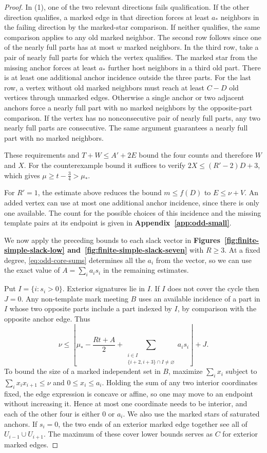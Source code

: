 \documentclass[preprint,11pt,numbers]{elsarticle-arxiv}
\numberwithin{equation}{section}
\theoremstyle{definition}
\begin{document}
\begin{proof}
In (1), one of the two relevant directions fails qualification.
If the other direction qualifies, a marked edge
in that direction forces at least $a_*$ neighbors in the failing
direction by the marked-star comparison. If neither qualifies, the
same comparison applies to any old marked neighbor. The second row
follows since one of the nearly full parts has at most $w$ marked
neighbors. In the third row, take a pair of nearly full parts for
which the vertex qualifies. The marked star from the missing anchor forces
at least $a_*$ further host neighbors in a third old part. There is
at least one additional anchor incidence outside the three parts.
For the last row, a vertex without old marked neighbors must reach
at least $C-D$ old vertices through unmarked edges. Otherwise a
single anchor or two adjacent anchors force a nearly full part
with no marked neighbors by the opposite-part comparison.
If the vertex has no nonconsecutive pair of nearly full parts, any
two nearly full parts are consecutive. The same argument guarantees
a nearly full part with no marked neighbors.

These requirements and $T+W\leq A'+2E$ bound the four counts and
therefore $W$ and $X$. For the counterexample bound it suffices to
verify $2X\leq (R'-2)D+3$, which gives $\mu\geq t-\frac{3}{4}>\mu_*$.

For $R'=1$, the estimate above reduces the bound $m\leq f(D)$ to 
$E\leq\nu+V$. An added vertex can use at most one additional anchor
incidence, since there is only one available. The count for the possible
choices of this incidence and the missing template pairs at its endpoint
is given in \textbf{Appendix~\ref{app:odd-small}}.

We now apply the preceding bounds to each slack vector in
\textbf{Figures~\ref{fig:finite-simple-slack-low}
and~\ref{fig:finite-simple-slack-seven}} with $R\geq3$.
At a fixed degree, \eqref{eq:odd-core-sums} determines all the
$a_i$ from the vector, so we can use the exact value of
$A=\sum_i a_is_i$ in the remaining estimates.

Put $I=\{i:s_i>0\}$. Exterior signatures lie in $I$. If $I$ does
not cover the cycle then $J=0$. Any non-template mark meeting $B$
uses an available incidence of a part in $I$ whose two opposite
parts include a part indexed by $I$,
by comparison with the opposite anchor edge. Thus
\[
 \nu\leq\left\lfloor \mu_*-\frac{Rt+A}{2}+
 \sum_{\substack{i\in I\\ \{i+2,i+3\}\cap I\ne\varnothing}}a_is_i
 \right\rfloor+J.
\]
To bound the size of a marked independent set in $B$, maximize
$\sum_i x_i$ subject to $\sum_i x_ix_{i+1}\leq \nu$ and
$0\leq x_i\leq a_i$. Holding the sum of any two interior coordinates
fixed, the edge expression is concave or affine, so one may move to
an endpoint without increasing it. Hence at most one coordinate
needs to be interior, and each of the other four is either $0$ or
$a_i$. We also use the marked stars of saturated anchors.
If $s_i=0$, the two ends of an exterior marked edge together
see all of $U_{i-1}\cup U_{i+1}$. The maximum of these cover
lower bounds serves as $C$ for exterior marked edges.


\end{proof}
\end{document}
